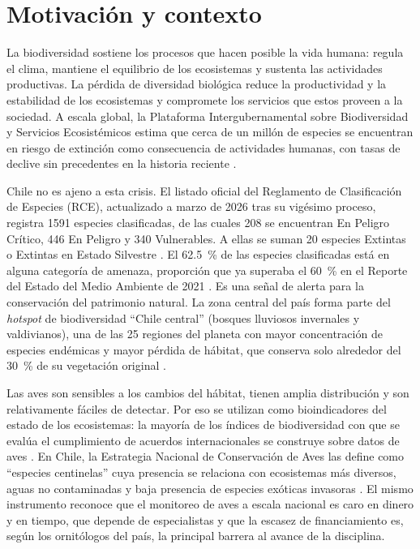 
\section{Motivación y contexto}\label{sec:motivacion}

La biodiversidad sostiene los procesos que hacen posible la vida humana:
regula el clima, mantiene el equilibrio de los ecosistemas y sustenta las
actividades productivas. La pérdida de diversidad biológica reduce la
productividad y la estabilidad de los ecosistemas y compromete los servicios
que estos proveen a la sociedad. A escala global, la Plataforma
Intergubernamental sobre Biodiversidad y Servicios Ecosistémicos estima que
cerca de un millón de especies se encuentran en riesgo de extinción como
consecuencia de actividades humanas, con tasas de declive sin precedentes en
la historia reciente \citep{ipbes2019}.

Chile no es ajeno a esta crisis. El listado oficial del Reglamento de
Clasificación de Especies (RCE), actualizado a marzo de 2026 tras su
vigésimo proceso, registra \num{1591} especies clasificadas, de las cuales
208 se encuentran En Peligro Crítico, 446 En Peligro y 340 Vulnerables. A
ellas se suman 20 especies Extintas o Extintas en Estado Silvestre
\citep{mma2026rce}. El \SI{62,5}{\percent} de las especies clasificadas
está en alguna categoría de amenaza, proporción que ya superaba el
\SI{60}{\percent} en el Reporte del Estado del Medio Ambiente de 2021
\citep{mma2021rema}. Es una señal de alerta para la conservación del
patrimonio natural. La zona central del país forma parte del
\textit{hotspot} de biodiversidad ``Chile central'' (bosques lluviosos
invernales y valdivianos), una de las 25 regiones del planeta con mayor
concentración de especies endémicas y mayor pérdida de hábitat, que conserva
solo alrededor del \SI{30}{\percent} de su vegetación original
\citep{myers2000hotspots}.

Las aves son sensibles a los cambios del hábitat, tienen amplia
distribución y son relativamente fáciles de detectar. Por eso se utilizan
como bioindicadores del estado de los ecosistemas: la mayoría de los índices
de biodiversidad con que se evalúa el cumplimiento de acuerdos
internacionales se construye sobre datos de aves \citep{fraixedas2020birds}. En Chile, la Estrategia Nacional de Conservación
de Aves las define como ``especies centinelas'' cuya presencia se relaciona
con ecosistemas más diversos, aguas no contaminadas y baja presencia de
especies exóticas invasoras \citep{mma2022enca}. El mismo instrumento
reconoce que el monitoreo de aves a escala nacional es caro en dinero y en
tiempo, que depende de especialistas y que la escasez de financiamiento es,
según los ornitólogos del país, la principal barrera al avance de la
disciplina.

